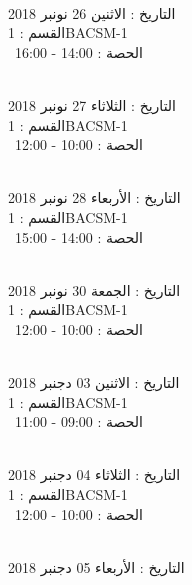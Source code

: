\documentclass[14pt a4paper twocolumn]{book}
\begin{document}
\par
\noindent\makebox[\linewidth]{\rule{\paperwidth}{0.4pt}}
 \\
التاريخ : الاثنين 26 نونبر 2018 \\
القسم : 1BACSM-1 \\
 \  
الحصة : 14:00 - 16:00 \\
\par
\noindent\makebox[\linewidth]{\rule{\paperwidth}{0.4pt}}
 \\
التاريخ : الثلاثاء 27 نونبر 2018 \\
القسم : 1BACSM-1 \\
 \  
الحصة : 10:00 - 12:00 \\
\par
\noindent\makebox[\linewidth]{\rule{\paperwidth}{0.4pt}}
 \\
التاريخ : الأربعاء 28 نونبر 2018 \\
القسم : 1BACSM-1 \\
 \  
الحصة : 14:00 - 15:00 \\
\par
\noindent\makebox[\linewidth]{\rule{\paperwidth}{0.4pt}}
 \\
التاريخ : الجمعة 30 نونبر 2018 \\
القسم : 1BACSM-1 \\
 \  
الحصة : 10:00 - 12:00 \\
\par
\noindent\makebox[\linewidth]{\rule{\paperwidth}{0.4pt}}
 \\
التاريخ : الاثنين 03 دجنبر 2018 \\
القسم : 1BACSM-1 \\
 \  
الحصة : 09:00 - 11:00 \\
\par
\noindent\makebox[\linewidth]{\rule{\paperwidth}{0.4pt}}
 \\
التاريخ : الثلاثاء 04 دجنبر 2018 \\
القسم : 1BACSM-1 \\
 \  
الحصة : 10:00 - 12:00 \\
\par
\noindent\makebox[\linewidth]{\rule{\paperwidth}{0.4pt}}
 \\
التاريخ : الأربعاء 05 دجنبر 2018 \\
\end{document}

